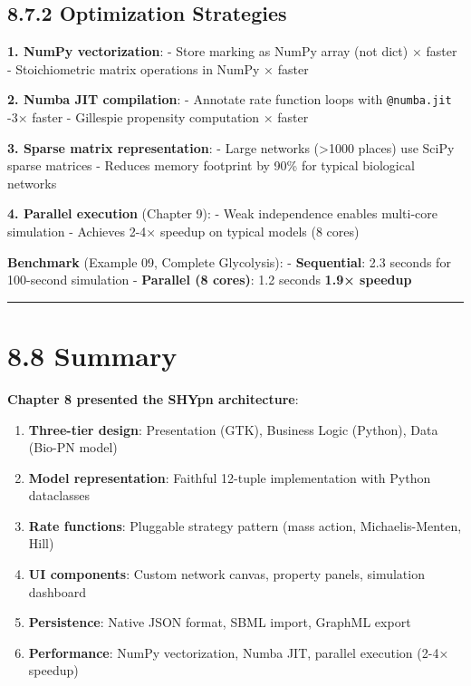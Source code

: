 \hypertarget{optimization-strategies}{%
\subsection{8.7.2 Optimization
Strategies}\label{optimization-strategies}}

\textbf{1. NumPy vectorization}: - Store marking as NumPy array (not
dict) × faster - Stoichiometric matrix operations in NumPy ×
faster

\textbf{2. Numba JIT compilation}: - Annotate rate function loops with
\passthrough{\lstinline!@numba.jit!} -3× faster - Gillespie
propensity computation × faster

\textbf{3. Sparse matrix representation}: - Large networks
(\textgreater1000 places) use SciPy sparse matrices - Reduces memory
footprint by 90\% for typical biological networks

\textbf{4. Parallel execution} (Chapter 9): - Weak independence enables
multi-core simulation - Achieves 2-4× speedup on typical models (8
cores)

\textbf{Benchmark} (Example 09, Complete Glycolysis): -
\textbf{Sequential}: 2.3 seconds for 100-second simulation -
\textbf{Parallel (8 cores)}: 1.2 seconds \textrightarrow \textbf{1.9× speedup}

\begin{center}\rule{0.5\linewidth}{0.5pt}\end{center}

\hypertarget{summary}{%
\section{8.8 Summary}\label{summary}}

\textbf{Chapter 8 presented the SHYpn architecture}:

\begin{enumerate}
\def\labelenumi{\arabic{enumi}.}
\tightlist
\item
  \textbf{Three-tier design}: Presentation (GTK), Business Logic
  (Python), Data (Bio-PN model)
\item
  \textbf{Model representation}: Faithful 12-tuple implementation with
  Python dataclasses
\item
  \textbf{Rate functions}: Pluggable strategy pattern (mass action,
  Michaelis-Menten, Hill)
\item
  \textbf{UI components}: Custom network canvas, property panels,
  simulation dashboard
\item
  \textbf{Persistence}: Native JSON format, SBML import, GraphML export
\item
  \textbf{Performance}: NumPy vectorization, Numba JIT, parallel
  execution (2-4× speedup)
\end{enumerate}

